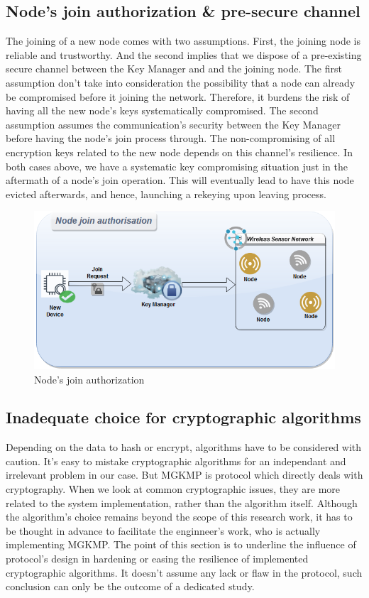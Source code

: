 \subsection{Node's join authorization \& pre-secure channel}
\label{subsec:node_join}

The joining of a new node comes with two assumptions. First, the joining node is reliable and trustworthy. And the second implies that we dispose of a pre-existing secure channel between the Key Manager and and the joining node.
The first assumption don’t take into consideration the possibility that a node can already be compromised before it joining the network. Therefore, it burdens the risk of having all the new node’s keys systematically compromised.
The second assumption assumes the communication’s security between the Key Manager before having the node’s join process through. The non-compromising of all encryption keys related to the new node depends on this channel’s resilience.
In both cases above, we have a systematic key compromising situation just in the aftermath of a node’s join operation. This will eventually lead to have this node evicted afterwards, and hence, launching a rekeying upon leaving process.

\begin{figure}[htbp]
	\centerline{\includegraphics[scale=0.60]{figures/mgkmp/join_auth.png}}
	\caption{Node's join authorization}
	\label{fig:node_join}
\end{figure}

\subsection{Inadequate choice for cryptographic algorithms}
\label{subsec:cryptography}

Depending on the data to hash or encrypt, algorithms have to be considered with caution. It's easy to mistake cryptographic algorithms for an independant and irrelevant problem in our case. But MGKMP is protocol which directly deals with cryptography. When we look at common cryptographic issues, they are more related to the system implementation, rather than the algorithm itself. Although the algorithm's choice remains beyond the scope of this research work, it has to be thought in advance to facilitate the enginneer's work, who is actually implementing MGKMP. The point of this section is to underline the influence of protocol's design in hardening or easing the resilience of implemented cryptographic algorithms. It doesn't assume any lack or flaw in the protocol, such conclusion can only be the outcome of a dedicated study.

